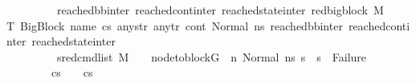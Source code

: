 \begin{isabellebody}
\ \ \ \ \ \ \ \ {\isachardoublequoteopen}{\isasymAnd}\ reached{\isacharunderscore}{\kern0pt}bb{\isacharunderscore}{\kern0pt}inter\ reached{\isacharunderscore}{\kern0pt}cont{\isacharunderscore}{\kern0pt}inter\ reached{\isacharunderscore}{\kern0pt}state{\isacharunderscore}{\kern0pt}inter{\isachardot}{\kern0pt}\ {\isacharparenleft}{\kern0pt}red{\isacharunderscore}{\kern0pt}bigblock\ M\ {\isasymLambda}\ {\isasymGamma}\ {\isasymOmega}\ T\ {\isacharparenleft}{\kern0pt}{\isacharparenleft}{\kern0pt}BigBlock\ name\ cs{}\ any{\isacharunderscore}{\kern0pt}str\ any{\isacharunderscore}{\kern0pt}tr{\isacharparenright}{\kern0pt}{\isacharcomma}{\kern0pt}\ cont{}{\isacharcomma}{\kern0pt}\ {\isacharparenleft}{\kern0pt}Normal\ ns{}{\isacharparenright}{\kern0pt}{\isacharparenright}{\kern0pt}\ {\isacharparenleft}{\kern0pt}reached{\isacharunderscore}{\kern0pt}bb{\isacharunderscore}{\kern0pt}inter{\isacharcomma}{\kern0pt}\ reached{\isacharunderscore}{\kern0pt}cont{\isacharunderscore}{\kern0pt}inter{\isacharcomma}{\kern0pt}\ reached{\isacharunderscore}{\kern0pt}state{\isacharunderscore}{\kern0pt}inter{\isacharparenright}{\kern0pt}{\isacharparenright}{\kern0pt}\ {\isasymLongrightarrow}\ \isanewline
\ \ \ \ \ \ \ \ {\isacharparenleft}{\kern0pt}{\isasymAnd}\ s{}{\isacharprime}{\kern0pt}{\isachardot}{\kern0pt}{\isacharparenleft}{\kern0pt}{\isacharparenleft}{\kern0pt}red{\isacharunderscore}{\kern0pt}cmd{\isacharunderscore}{\kern0pt}list\ M\ {\isasymLambda}\ {\isasymGamma}\ {\isasymOmega}\ {\isacharparenleft}{\kern0pt}node{\isacharunderscore}{\kern0pt}to{\isacharunderscore}{\kern0pt}block{\isacharparenleft}{\kern0pt}G{\isacharparenright}{\kern0pt}\ {\isacharbang}{\kern0pt}\ n{\isacharparenright}{\kern0pt}\ {\isacharparenleft}{\kern0pt}Normal\ ns{}{\isacharparenright}{\kern0pt}\ s{}{\isacharprime}{\kern0pt}{\isacharparenright}{\kern0pt}\ {\isasymLongrightarrow}\ {\isacharparenleft}{\kern0pt}s{}{\isacharprime}{\kern0pt}\ {\isasymnoteq}\ Failure{\isacharparenright}{\kern0pt}{\isacharparenright}{\kern0pt}{\isacharparenright}{\kern0pt}\ {\isasymLongrightarrow}\ \isanewline
\ \ \ \ \ \ \ \ cs{}\ {\isasymnoteq}\ {\isacharbrackleft}{\kern0pt}{\isacharbrackright}{\kern0pt}\ {\isasymLongrightarrow}\ cs{}\ {\isasymnoteq}\ {\isacharbrackleft}{\kern0pt}{\isacharbrackright}{\kern0pt}\ {\isasymLongrightarrow}\ \ \isanewline

\end{isabellebody}
